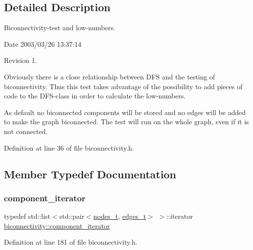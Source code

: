 \subsection{Detailed Description}
Biconnectivity-\/test and low-\/numbers. 

\begin{DoxyParagraph}{Date}
2003/03/26 13\+:37\+:14 
\end{DoxyParagraph}
\begin{DoxyParagraph}{Revision}
1. 
\end{DoxyParagraph}


Obviously there is a close relationship between D\+FS and the testing of biconnectivity. Thus this test takes advantage of the possibility to add pieces of code to the D\+F\+S-\/class in order to calculate the low-\/numbers.

As default no biconnected components will be stored and no edges will be added to make the graph biconnected. The test will run on the whole graph, even if it is not connected. 

Definition at line 36 of file biconnectivity.\+h.



\subsection{Member Typedef Documentation}
\mbox{\label{classbiconnectivity_aef69aa0c23bfcd945e385350154b6483}} 
\subsubsection{\texorpdfstring{component\+\_\+iterator}{component\_iterator}}
{\footnotesize\ttfamily typedef std\+::list$<$std\+::pair$<$\mbox{\hyperlink{edge_8h_a22ac17689106ba21a84e7bc54d1199d6}{nodes\+\_\+t}}, \mbox{\hyperlink{edge_8h_a8f9587479bda6cf612c103494b3858e3}{edges\+\_\+t}}$>$ $>$\+::iterator \mbox{\hyperlink{classbiconnectivity_aef69aa0c23bfcd945e385350154b6483}{biconnectivity\+::component\+\_\+iterator}}}



Definition at line 181 of file biconnectivity.\+h.

\mbox{\label{classbiconnectivity_ac9063160d59ab0ea4fa924a68395700b}} 
